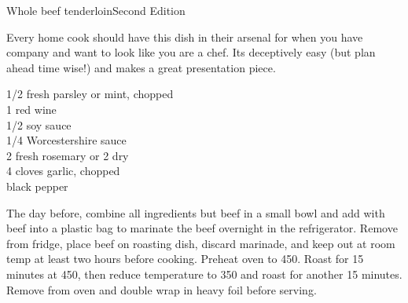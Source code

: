 \begin{entry}{Whole beef tenderloin}{Second Edition}

\begin{open}
  Every home cook should have this dish in their arsenal for when you have
  company and want to look like you are a chef. Its deceptively easy (but plan
  ahead time wise!) and makes a great presentation piece.
\end{open}

\begin{ingredients}
    \SI{1/2}{\cup} fresh parsley or mint, chopped\\
    \SI{1}{\cup} red wine\\
    \SI{1/2}{\cup} soy sauce\\
    \SI{1/4}{\cup} Worcestershire sauce\\
    \SI{2}{\tblspoon} fresh rosemary or \SI{2}{\teaspoon} dry\\
    4 cloves garlic, chopped\\
    black pepper
\end{ingredients}
%
%
The day before, combine all ingredients but beef in a small bowl and add with
beef into a plastic bag to marinate the beef overnight in the
refrigerator. Remove from fridge, place beef on roasting dish, discard
marinade, and keep out at room temp at least two hours before cooking. Preheat
oven to \SI{450}{\degreeF}. Roast for 15 minutes at \SI{450}{\degreeF}, then
reduce temperature to 350 and roast for another 15 minutes. Remove from oven
and double wrap in heavy foil before serving.
%
\end{entry}

